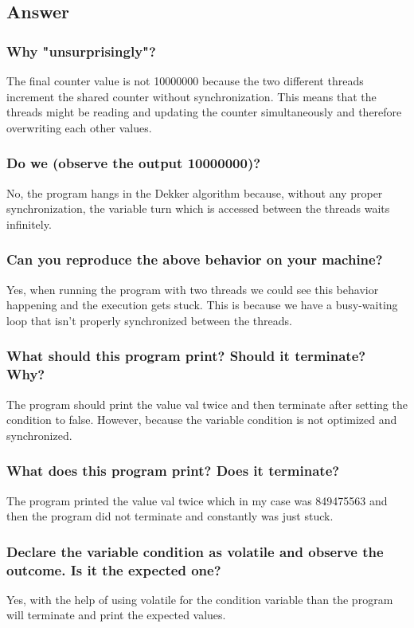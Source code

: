 \documentclass{article}
\begin{document}
\subsection*{Answer}
\subsubsection*{Why "unsurprisingly"?}
The final counter value is not 10000000 because the two different threads increment the shared counter without synchronization. This means that the threads might be reading and updating the counter simultaneously and therefore overwriting each other values.

\subsubsection*{Do we (observe the output 10000000)?}
No, the program hangs in the Dekker algorithm because, without any proper synchronization, the variable turn which is accessed between the threads waits infinitely.

\subsubsection*{Can you reproduce the above behavior on your machine?}
Yes, when running the program with two threads we could see this behavior happening and the execution gets stuck. This is because we have a busy-waiting loop that isn't properly synchronized between the threads.

\subsubsection*{What should this program print? Should it terminate? Why?}
The program should print the value val twice and then terminate after setting the condition to false. However, because the variable condition is not optimized and synchronized.

\subsubsection*{What does this program print? Does it terminate?}
The program printed the value val twice which in my case was 849475563 and then the program did not terminate and constantly was just stuck.

\subsubsection*{Declare the variable condition as volatile and observe the outcome. Is it the expected one?}
Yes, with the help of using volatile for the condition variable than the program will terminate and print the expected values.
\end{document}
